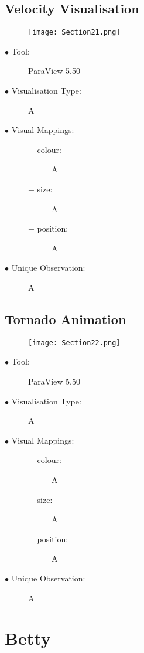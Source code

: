 \documentclass{article}
\begin{document}
\subsection{Velocity Visualisation}
\begin{figure}[h]
	\centering
	\texttt{[image: Section21.png]}
\end{figure}
\begin{description}
	\item[$\bullet$ Tool:] ParaView 5.50
	\item[$\bullet$ Visualisation Type:] A
	\item[$\bullet$ Visual Mappings:] \hfill
		\begin{description}
			\item[$-$ colour:] A
			\item[$-$ size:] A
			\item[$-$ position:] A
		\end{description}
	\item[$\bullet$ Unique Observation:] A
\end{description}
\newpage

\subsection{Tornado Animation}
\begin{figure}[h]
	\centering
	\texttt{[image: Section22.png]}
\end{figure}
\begin{description}
	\item[$\bullet$ Tool:] ParaView 5.50
	\item[$\bullet$ Visualisation Type:] A
	\item[$\bullet$ Visual Mappings:] \hfill
		\begin{description}
			\item[$-$ colour:] A
			\item[$-$ size:] A
			\item[$-$ position:] A
		\end{description}
	\item[$\bullet$ Unique Observation:] A
\end{description}
\newpage

\section{Betty}
\end{document}
